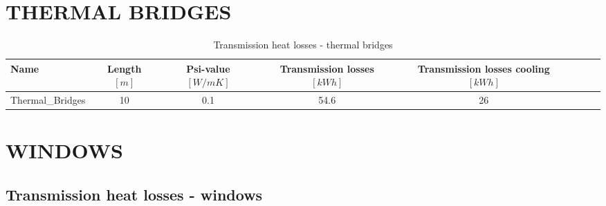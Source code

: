 \documentclass{article}
\begin{document}
\section*{THERMAL BRIDGES}
\begin{table}[h!]
    \centering
    \caption{Transmission heat losses - thermal bridges}
    \begin{tabular}{@{}lccccccc@{}}
        \toprule
        Name & Length $[m]$ & Psi-value $[W/mK]$ & Transmission losses $[kWh]$ & Transmission losses cooling $[kWh]$ \\
        \midrule
        Thermal\_Bridges & 10 & 0.1 & 54.6 & 26 \\
        \bottomrule
    \end{tabular}
\end{table}


\section*{WINDOWS}
\subsection*{Transmission heat losses - windows}
\end{document}
